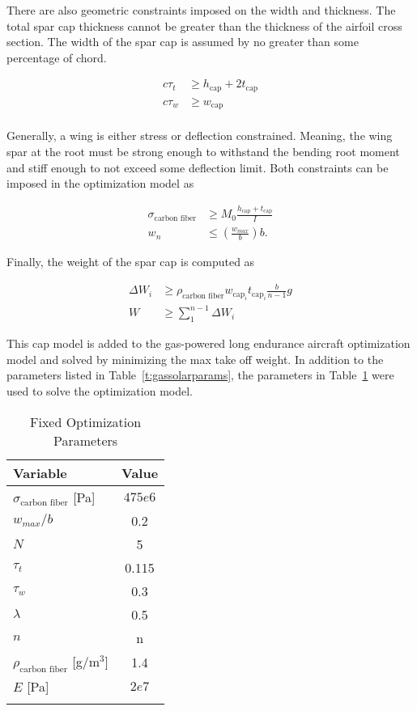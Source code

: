 \documentclass[]{aiaa-tc}%
\begin{document}
There are also geometric constraints imposed on the width and thickness.  The total spar cap thickness cannot be greater than the thickness of the airfoil cross section.  The width of the spar cap is assumed by no greater than some percentage of chord.

\begin{align}
    \label{e:thickness}
    c\tau_t &\geq h_{\text{cap}} + 2t_{\text{cap}} \\
    \label{e:width}
    c\tau_w &\geq w_{\text{cap}} \\
    \end{align}

Generally, a wing is either stress or deflection constrained. Meaning, the wing spar at the root must be strong enough to withstand the bending root moment and stiff enough to not exceed some deflection limit.  Both constraints can be imposed in the optimization model as

\begin{align}
    \label{e:stresscont}
    \sigma_{\text{carbon fiber}} &\geq M_0 \frac{h_{\text{cap}}+t_{\text{cap}}}{I}\\
    \label{e:defcont}
    w_n &\leq \left(\frac{w_{max}}{b} \right) b.
\end{align}

Finally, the weight of the spar cap is computed as

\begin{align}
    \label{e:sparmass}
    \Delta W_i &\geq \rho_{\text{carbon fiber}} w_{\text{cap}_i}t_{\text{cap}_i} \frac{b}{n-1}g \\
    \label{e:sparmasssum}
    W &\geq \sum\limits_{1}^{n-1} \Delta W_i
\end{align}

This cap model is added to the gas-powered long endurance aircraft optimization model and solved by minimizing the max take off weight.  In addition to the parameters listed in Table~\ref{t:gassolarparams}, the parameters in Table~\ref{t:sparparams} were used to solve the optimization model.  \\


\begin{longtable}{lc}
     \caption{Fixed Optimization Parameters} \\
     \toprule
     \toprule
     Variable &  Value  \\
     \midrule
     $\sigma_{\text{carbon fiber}}$ [Pa] & $475e6$ \\
     $w_{max}/b$          & 0.2    \\ 
     $N$                  & 5      \\ 
     $\tau_t$             & 0.115  \\ 
     $\tau_w$             & 0.3    \\ 
     $\lambda$            & 0.5    \\ 
     $n$                  & n      \\ 
     $\rho_{\text{carbon fiber}}$ [g/m$^3$] & 1.4 \\
     $E$ [Pa] & $2e7$\\
     \bottomrule
     \label{t:sparparams}
\end{longtable}
\end{document}
